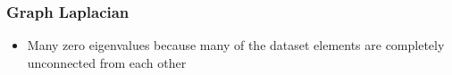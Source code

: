 \documentclass[9pt]{beamer}
\begin{document}
\begin{frame}
\frametitle{Graph Laplacian}
\label{sec-3-3}

\vspace*{-0.0cm}\begin{figure}
\end{figure}
\begin{itemize}
\item Many zero eigenvalues because many of the dataset elements are
  completely unconnected from each other
\end{itemize}
\end{frame}
\end{document}
